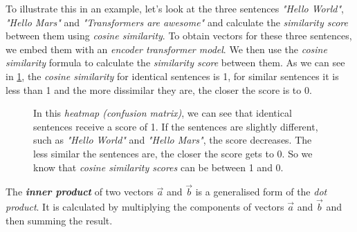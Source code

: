 \documentclass{article}
\begin{document}
To illustrate this in an example, let's look at the three sentences \textit{"Hello World"}, \textit{"Hello Mars"} and \textit{"Transformers are awesome"} and calculate the \textit{similarity score} between them using \textit{cosine similarity}. To obtain vectors for these three sentences, we embed them with an \textit{encoder transformer model}. We then use the \textit{cosine similarity} formula to calculate the \textit{similarity score} between them. As we can see in \cref{cosineSimilarityHeatmap}, the \textit{cosine similarity} for identical sentences is 1, for similar sentences it is less than 1 and the more dissimilar they are, the closer the score is to 0.

\begin{figure}[H]
    \centering
{}
\caption{In this \textit{heatmap (confusion matrix)}, we can see that identical sentences receive a score of 1. If the sentences are slightly different, such as \textit{"Hello World"} and \textit{"Hello Mars"}, the score decreases. The less similar the sentences are, the closer the score gets to 0. So we know that \textit{cosine similarity scores} can be between 1 and 0.}
\label{cosineSimilarityHeatmap}
\end{figure}

The \textit{\textbf{inner product}} of two vectors $\vec{a}$ and $\vec{b}$ is a generalised form of the \textit{dot product}. It is calculated by multiplying the components of vectors $\vec{a}$ and $\vec{b}$ and then summing the result.
\end{document}
